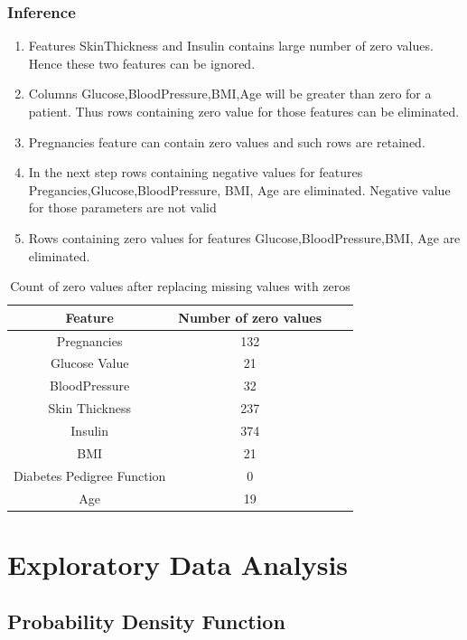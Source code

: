 \documentclass[12pt]{article}
\begin{document}
\subsubsection{Inference}
\begin{enumerate}
\item Features SkinThickness and Insulin contains large number of zero values. Hence these two features can be ignored.
\item Columns Glucose,BloodPressure,BMI,Age will be greater than zero for a patient. Thus rows containing zero value for those features can be eliminated.
\item Pregnancies feature can contain zero values and such rows are retained.
\item In the next step rows containing negative values for features Pregancies,Glucose,BloodPressure, BMI, Age are eliminated. Negative value for those parameters are not valid
\item Rows containing zero values for features Glucose,BloodPressure,BMI,
Age are eliminated.
\end{enumerate}

\begin{table}[h]
\begin{center}
\begin{tabular}{|c|c|c|c|}
\hline
 \textbf{Feature} & \textbf{Number of zero values}\\\hline
Pregnancies  & 132\\\hline
Glucose Value  & 21\\\hline
BloodPressure  & 32\\\hline
Skin Thickness & 237\\\hline
Insulin  & 374\\\hline
BMI  & 21\\\hline
Diabetes Pedigree Function  & 0\\\hline
Age  & 19\\\hline
\end{tabular}
\end{center}
\caption{Count of zero values after replacing missing values with zeros}
\end{table}

\section{Exploratory Data Analysis}

\subsection{Probability Density Function}
\end{document}
